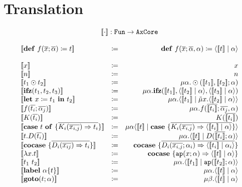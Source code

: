 \documentclass{article}
\newcommand{\translate}[1]{\ensuremath{[\![#1]\!]}}
\newcommand{\cut}[2]{\ensuremath{\langle #1 \mid #2 \rangle}}
\newcommand{\letin}[3]{\ensuremath{\mathbf{let}\ #1 \coloneq #2\ \mathbf{in}\ #3}}
\newcommand{\caseof}[2]{\ensuremath{\mathbf{case}\ #1\ \mathbf{of}\ \{ #2 \}}}
\begin{document}
\section{Translation}
\[
  \begin{array}{l c r}
    \multicolumn{3}{c}{\translate{\cdot} : \mathtt{Fun} \rightarrow \mathtt{AxCore}}\\
    \\
    \translate{\mathbf{def}\ f(\overline{x};\overline{\alpha}) \coloneq t} & \coloneq & \mathbf{def}\ f(\overline{x};\overline{\alpha},\alpha) \coloneq \cut{\translate{t}}{\alpha}\\
  \quad \\
    \translate{x} & \coloneq & x\\
    \translate{n} & \coloneq & n\\
    \translate{t_1 \odot t_2} & \coloneq & \mu \alpha.\odot(\translate{t_1},\translate{t_2};\alpha)\\
    \translate{\mathbf{ifz}(t_1,t_2,t_3)} & \coloneq & \mu \alpha.\mathbf{ifz}(\translate{t_1},\cut{\translate{t_2}}{\alpha},\cut{\translate{t_3}}{\alpha}) \\
    \translate{\letin{x}{t_1}{t_2}} & \coloneq & \mu \alpha.\cut{\translate{t_1}}{\tilde{\mu}x.\cut{\translate{t_2}}{\alpha}}\\
    \translate{f(\overline{t_i};\overline{\alpha_j})} & \coloneq & \mu \alpha.f(\overline{\translate{t_i}};\overline{\alpha_j},\alpha)\\
    \translate{K(\overline{t_i})} & \coloneq & K(\overline{\translate{t_i}})\\
    \translate{\caseof{t}{\overline{K_i(\overline{x_{i,j}}) \Rightarrow t_i}}} & \coloneq & \mu \alpha \cut{\translate{t}}{\mathbf{case}\ \{ \overline{K_i(\overline{x_{i,j}}) \Rightarrow \cut{\translate{t_i}}{\alpha}}\}}\\
    \translate{t.D(\overline{t_i})} & \coloneq & \mu\alpha.\cut{\translate{t}}{D(\overline{\translate{t_i}};\alpha)}\\
    \translate{\mathbf{cocase}\ \{\overline{D_i(\overline{x_{ij}})\Rightarrow t_i}\}} & \coloneq & \mathbf{cocase}\ \{ \overline{D_i(\overline{x_{i,j}};\alpha_i)\Rightarrow \cut{\translate{t_i}}{\alpha_i}} \} \\
    \translate{\lambda x.t} & \coloneq & \mathbf{cocase}\ \{ \mathtt{ap}(x;\alpha) \Rightarrow \cut{\translate{t}}{\alpha}\}\\
    \translate{t_1\ t_2} & \coloneq & \mu \alpha. \cut{\translate{t_1}}{\mathtt{ap}(\translate{t_2};\alpha)}\\
    \translate{\mathbf{label}\ \alpha \{t\}} & \coloneq & \mu\alpha. \cut{\translate{t}}{\alpha}\\
    \translate{\mathbf{goto}(t;\alpha)} & \coloneq & \mu\beta.\cut{\translate{t}}{\alpha}
  \end{array}
\]
\end{document}
